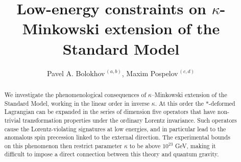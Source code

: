 \documentclass[prl,tightenlines]{revtex4}
\begin{document}
\renewcommand{\thefootnote}{\fnsymbol{footnote}}

\setcounter{page}{1}



\title{Low-energy constraints on $\kappa$-Minkowski extension of
the Standard Model}

\author{Pavel A. Bolokhov$^{\,(a,b)}$, Maxim Pospelov$^{\,(c,d)}$}



\begin{abstract}
We investigate the phenomenological consequences of $\kappa$--Minkowski extension of the 
Standard Model, working in the linear order in inverse $\kappa$. At this order the
$*$-deformed Lagrangian can be expanded in the series of dimension five operators that have non-trivial 
transformation properties under the ordinary Lorentz invariance. 
Such operators cause the Lorentz-violating signatures at low energies, and in particular 
lead to the anomalous spin precession linked to the external direction. The experimental 
bounds on this phenomenon then restrict parameter $\kappa$ to be above $10^{23}$ GeV,
making it difficult to impose a direct connection between this theory and quantum gravity. 
\end{abstract}
\end{document}
